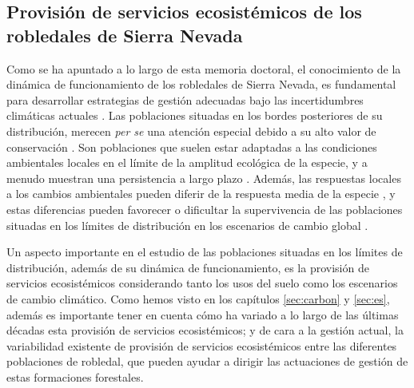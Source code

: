 \subsection*{Provisión de servicios ecosistémicos de los robledales de Sierra Nevada
}\label{sec:discussions:es}
Como se ha apuntado a lo largo de esta memoria doctoral, el conocimiento de la dinámica de funcionamiento de los robledales de Sierra Nevada, es fundamental para desarrollar estrategias de gestión adecuadas bajo las incertidumbres climáticas actuales \autocites{Fadyetal2016EvolutionbasedApproach,Jumpetal2010MonitoringManaging}. Las poblaciones situadas en los bordes posteriores de su distribución, merecen \emph{per se} una atención especial debido a su alto valor de conservación \autocite{Fadyetal2016EvolutionbasedApproach}. Son poblaciones que suelen estar adaptadas a las condiciones ambientales locales en el límite de la amplitud ecológica de la especie, y a menudo muestran una persistencia a largo plazo \autocite{HampePetit2005ConservingBiodiversity}. Además, las respuestas locales a los cambios ambientales pueden diferir de la respuesta media de la especie \autocites{Benavidesetal2013DirectIndirect,Matiasetal2017ContrastingGrowth,Castroetal2004SeedlingEstablishment}, y estas diferencias pueden favorecer o dificultar la supervivencia de las poblaciones situadas en los límites de distribución en los escenarios de cambio global \autocites{Fadyetal2016EvolutionbasedApproach,Jumpetal2010MonitoringManaging}. 

Un aspecto importante en el estudio de las poblaciones situadas en los límites de distribución, además de su dinámica de funcionamiento, es la provisión de servicios ecosistémicos considerando tanto los usos del suelo como los escenarios de cambio climático. Como hemos visto en los capítulos \ref{sec:carbon} y \ref{sec:es}, además es importante tener en cuenta cómo ha variado a lo largo de las últimas décadas esta provisión de servicios ecosistémicos; y de cara a la gestión actual, la variabilidad existente de provisión de servicios ecosistémicos entre las diferentes poblaciones de robledal, que pueden ayudar a dirigir las actuaciones de gestión de estas formaciones forestales. 

